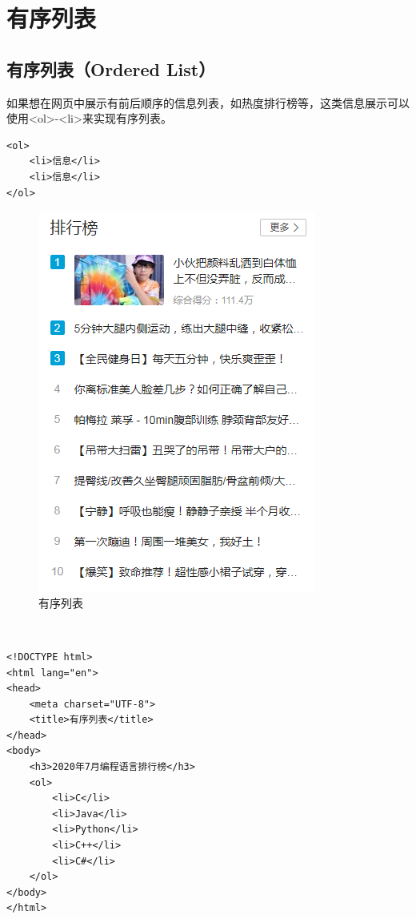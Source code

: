 \section{有序列表}

\subsection{有序列表（Ordered List）}

如果想在网页中展示有前后顺序的信息列表，如热度排行榜等，这类信息展示可以使用<ol>-<li>来实现有序列表。\\

\begin{lstlisting}[style=htmlcssjs]
<ol>
    <li>信息</li>
    <li>信息</li>
</ol>
\end{lstlisting}

\begin{figure}[H]
	\centering
	\includegraphics[scale=0.7]{img/C3/3-1/1.png}
	\caption{有序列表}
\end{figure}

\\

\begin{lstlisting}[style=htmlcssjs]
<!DOCTYPE html>
<html lang="en">
<head>
    <meta charset="UTF-8">
    <title>有序列表</title>
</head>
<body>
    <h3>2020年7月编程语言排行榜</h3>
    <ol>
        <li>C</li>
        <li>Java</li>
        <li>Python</li>
        <li>C++</li>
        <li>C#</li>
    </ol>
</body>
</html>
\end{lstlisting}

